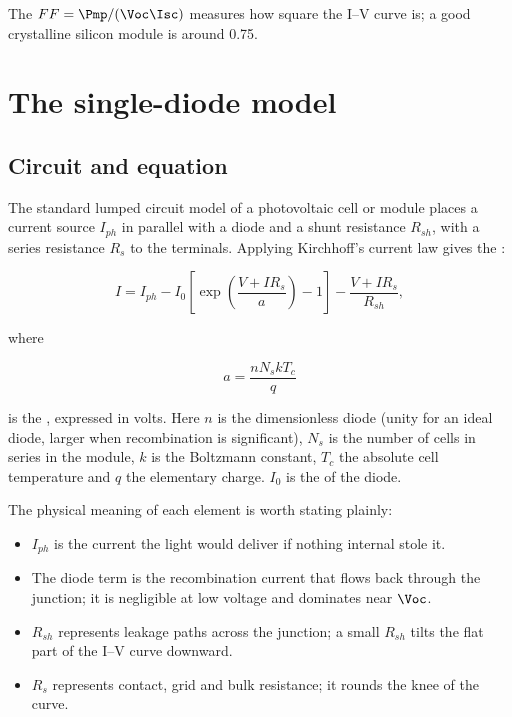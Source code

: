 The  $FF = \Pmp / (\Voc \Isc)$ measures how square the I--V
curve is; a good crystalline silicon module is around \num{0.75}.

\section{The single-diode model}

\subsection{Circuit and equation}

The standard lumped circuit model of a photovoltaic cell or module places a
current source $I_{ph}$ in parallel with a diode and a shunt resistance
$R_{sh}$, with a series resistance $R_s$ to the terminals. Applying Kirchhoff's
current law gives the :

\begin{equation}
I = I_{ph} - I_0\!\left[\exp\!\left(\frac{V + I R_s}{a}\right) - 1\right] - \frac{V + I R_s}{R_{sh}} ,
\label{eq:singlediode}
\end{equation}

where

\begin{equation}
a = \frac{n N_s k T_c}{q}
\label{eq:idealityvolts}
\end{equation}

is the , expressed in volts. Here $n$ is the
dimensionless diode  (unity for an ideal diode, larger
when recombination is significant), $N_s$ is the number of cells in series in
the module, $k$ is the Boltzmann constant, $T_c$ the absolute cell temperature
and $q$ the elementary charge. $I_0$ is the  of
the diode.

The physical meaning of each element is worth stating plainly:

\begin{itemize}[leftmargin=1.4em]
  \item $I_{ph}$ is the current the light would deliver if nothing internal
        stole it.
  \item The diode term is the recombination current that flows back through the
        junction; it is negligible at low voltage and dominates near $\Voc$.
  \item $R_{sh}$ represents leakage paths across the junction; a small $R_{sh}$
        tilts the flat part of the I--V curve downward.
  \item $R_s$ represents contact, grid and bulk resistance; it rounds the knee
        of the curve.
\end{itemize}

